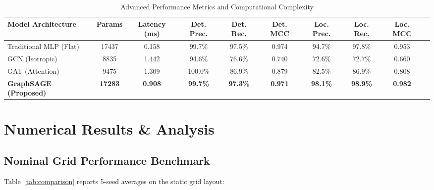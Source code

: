 \documentclass[conference]{IEEEtran}
\begin{document}
\begin{table}[t]
  \caption{Advanced Performance Metrics and Computational Complexity}
  \label{tab:advanced_metrics}
  \centering
  \begin{tabular}{lccccccccc}
    \hline
    \textbf{Model Architecture} & \textbf{Params} & \textbf{Latency (ms)} & \textbf{Det. Prec.} & \textbf{Det. Rec.} & \textbf{Det. MCC} & \textbf{Loc. Prec.} & \textbf{Loc. Rec.} & \textbf{Loc. MCC} \\
    \hline
    Traditional MLP (Flat) & 17437 & 0.158 & 99.7\% & 97.5\% & 0.974 & 94.7\% & 97.8\% & 0.953 \\
    GCN (Isotropic) & 8835 & 1.442 & 94.6\% & 76.6\% & 0.740 & 72.6\% & 72.7\% & 0.660 \\
    GAT (Attention) & 9475 & 1.309 & 100.0\% & 86.9\% & 0.879 & 82.5\% & 86.9\% & 0.808 \\
    \textbf{GraphSAGE (Proposed)} & \textbf{17283} & \textbf{0.908} & \textbf{99.7\%} & \textbf{97.3\%} & \textbf{0.971} & \textbf{98.1\%} & \textbf{98.9\%} & \textbf{0.982} \\
    \hline
  \end{tabular}
\end{table}

\section{Numerical Results \& Analysis}

\subsection{Nominal Grid Performance Benchmark}
Table~\ref{tab:comparison} reports 5-seed averages on the static grid layout:

\begin{table}[htbp]
  \caption{Performance Comparison under Nominal Grid Layout}
  \label{tab:comparison}
  \centering
\end{table}
\end{document}
